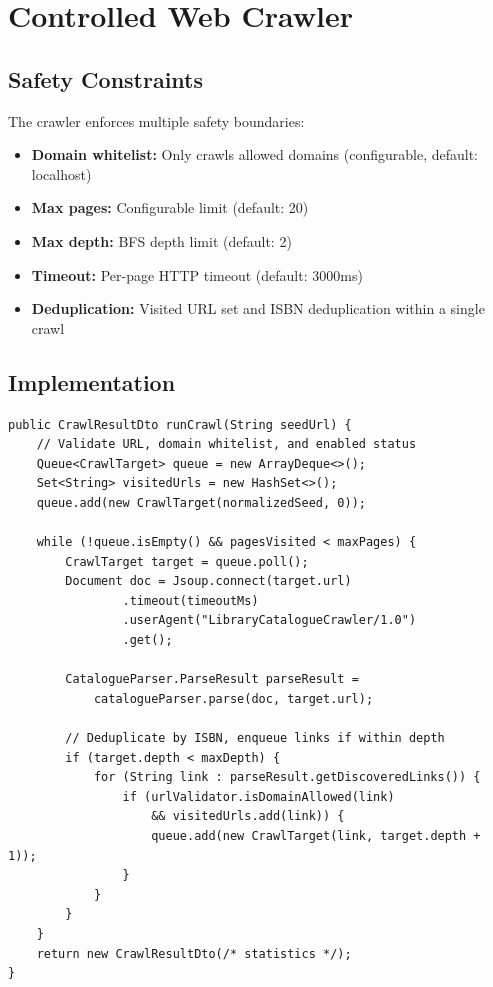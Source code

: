 \documentclass[12pt,a4paper]{report}
\begin{document}
\section{Controlled Web Crawler}

\subsection{Safety Constraints}
The crawler enforces multiple safety boundaries:
\begin{itemize}[noitemsep]
    \item \textbf{Domain whitelist:} Only crawls allowed domains (configurable, default: localhost)
    \item \textbf{Max pages:} Configurable limit (default: 20)
    \item \textbf{Max depth:} BFS depth limit (default: 2)
    \item \textbf{Timeout:} Per-page HTTP timeout (default: 3000ms)
    \item \textbf{Deduplication:} Visited URL set and ISBN deduplication within a single crawl
\end{itemize}

\subsection{Implementation}
\begin{lstlisting}[style=JavaStyle, caption={CrawlerService.java -- BFS Crawl Engine (Abbreviated)}]
public CrawlResultDto runCrawl(String seedUrl) {
    // Validate URL, domain whitelist, and enabled status
    Queue<CrawlTarget> queue = new ArrayDeque<>();
    Set<String> visitedUrls = new HashSet<>();
    queue.add(new CrawlTarget(normalizedSeed, 0));

    while (!queue.isEmpty() && pagesVisited < maxPages) {
        CrawlTarget target = queue.poll();
        Document doc = Jsoup.connect(target.url)
                .timeout(timeoutMs)
                .userAgent("LibraryCatalogueCrawler/1.0")
                .get();

        CatalogueParser.ParseResult parseResult =
            catalogueParser.parse(doc, target.url);

        // Deduplicate by ISBN, enqueue links if within depth
        if (target.depth < maxDepth) {
            for (String link : parseResult.getDiscoveredLinks()) {
                if (urlValidator.isDomainAllowed(link)
                    && visitedUrls.add(link)) {
                    queue.add(new CrawlTarget(link, target.depth + 1));
                }
            }
        }
    }
    return new CrawlResultDto(/* statistics */);
}
\end{lstlisting}
\end{document}

